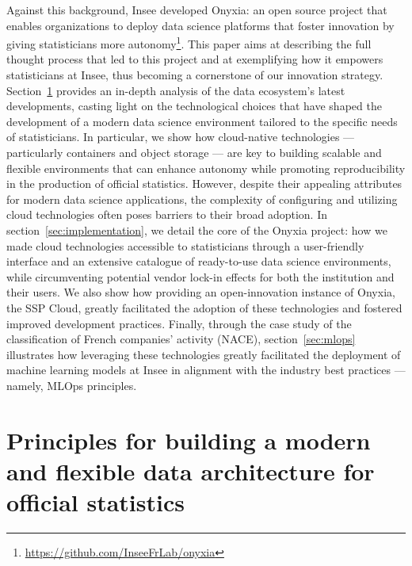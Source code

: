 \documentclass[graybox]{svmult}
\begin{document}
Against this background, Insee developed Onyxia: an open source project that enables organizations to deploy data science platforms that foster innovation by giving statisticians more autonomy\footnote{\url{https://github.com/InseeFrLab/onyxia}}. This paper aims at describing the full thought process that led to this project and at exemplifying how it empowers statisticians at Insee, thus becoming a cornerstone of our innovation strategy. Section~\ref{sec:principles} provides an in-depth analysis of the data ecosystem's latest developments, casting light on the technological choices that have shaped the development of a modern data science environment tailored to the specific needs of statisticians. In particular, we show how cloud-native technologies — particularly containers and object storage — are key to building scalable and flexible environments that can enhance autonomy while promoting reproducibility in the production of official statistics. However, despite their appealing attributes for modern data science applications, the complexity of configuring and utilizing cloud technologies often poses barriers to their broad adoption. In section~\ref{sec:implementation}, we detail the core of the Onyxia project: how we made cloud technologies accessible to statisticians through a user-friendly interface and an extensive catalogue of ready-to-use data science environments, while circumventing potential vendor lock-in effects for both the institution and their users. We also show how providing an open-innovation instance of Onyxia, the SSP Cloud, greatly facilitated the adoption of these technologies and fostered improved development practices. Finally, through the case study of the classification of French companies' activity (NACE), section~\ref{sec:mlops} illustrates how leveraging these technologies greatly facilitated the deployment of machine learning models at Insee in alignment with the industry best practices — namely, MLOps principles.




\section{Principles for building a modern and flexible data architecture for official statistics}
\label{sec:principles}
\end{document}
